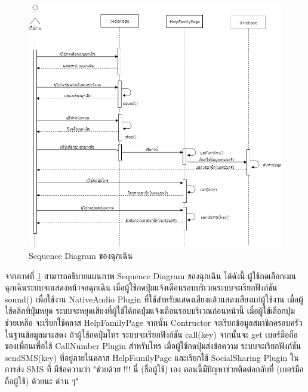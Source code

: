  
\begin{figure}[H]
	\centering
	\includegraphics[width=1.1\columnwidth]
	{Figures/3/Sequence/danger}
	\caption{Sequence Diagram ของฉุกเฉิน}
	\label{Fig:Sequence-danger}
\end{figure}
\newpage

จากภาพที่ \ref{Fig:Sequence-danger} สามารถอธิบายแผนภาพ Sequence Diagram ของฉุกเฉิน ได้ดังนี้ 
ผู้ใช้กดเลือกเมนฉุกเฉินระบบจะแสดงหน้าจอฉุกเฉิน เมื่อผู้ใช้กดปุ่มแจ้งเตือนรอบบริเวณระบบจะเรียกฟังก์ชัน sound() เพื่อใช้งาน NativeAudio Plugin ที่ใช้สำหรับแสดงเสียงแล้วแสดงเสียงแก่ผู้ใช้งาน 
เมื่อผู้ใช้คลิกที่ปุ่มหยุด ระบบจะหยุดเสียงที่ผู้ใช้ได้กดปุ่มแจ้งเตือนรอบบริเวณก่อนหน้านี้ เมื่อผู้ใช้เลือกปุ่มช่วยเหลือ จะเรียกใช้คลาส HelpFamilyPage จากนั้น Contructor จะเรียกข้อมูลสมาชิกครอบครัวในฐานข้อมูลมาแสดง 
ถ้าผู้ใช้กดปุ่มโทร ระบบจะเรียกฟังก์ชัน call(key) จากนั้นจะ get เบอร์มือถือของเพื่อนเพื่อใช้ CallNumber Plugin สำหรับโทร เมื่อผู้ใช้กดปุ่มส่งข้อความ ระบบจะเรียกฟังก์ชัน sendSMS(key) ที่อยู่ภายในคลาส HelpFamilyPage และเรียกใช้ SocialSharing Plugin ในการส่ง SMS ที่
มีข้อความว่า "ช่วยด้วย !!! นี่ (ชื่อผู้ใช้) เอง ตอนนี้มีปัญหาช่วยติดต่อกลับที่ (เบอร์มือถือผู้ใช้) ด้วยนะ ด่วน ๆ"
